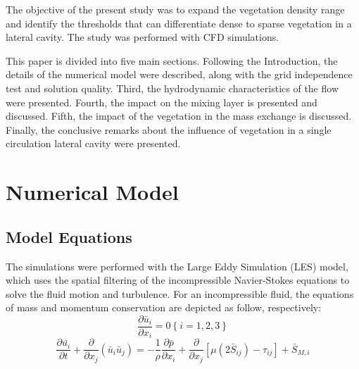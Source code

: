 The objective of the present study was to expand the vegetation density range and identify the thresholds that can differentiate dense to sparse vegetation in a lateral cavity. The study was performed with CFD simulations.

This paper is divided into five main sections. Following the Introduction, the details of the numerical model were described, along with the grid independence test and solution quality. Third, the hydrodynamic characteristics of the flow were presented. Fourth, the impact on the mixing layer is presented and discussed. Fifth, the impact of the vegetation in the mass exchange is discussed. Finally, the conclusive remarks about the influence of vegetation in a single circulation lateral cavity were presented.

\section{Numerical Model}
\subsection{Model Equations}
The simulations were performed with the Large Eddy Simulation (LES) model, which uses the spatial filtering of the incompressible Navier-Stokes equations to solve the fluid motion and turbulence. For an incompressible fluid, the equations of mass and momentum conservation are depicted as follow, respectively:
\begin{equation}
\frac{\partial \bar{u}_i}{\partial x_i}=0  \left \{ i=1,2,3 \right \}
\label{eqn:art4:continuity}
\end{equation}
\begin{equation}
\frac{\partial \bar{u_i}}{\partial t}+\frac{\partial}{\partial x_j}(\bar{u}_i \bar{u}_j)=-\frac{1}{\rho}\frac{\partial \bar{p}}{\partial x_i}+\frac{\partial}{\partial x_j}\left [ \mu (2\bar{S}_{ij}) - \tau_{ij} \right ] + \bar{S}_{M,i}
\label{eqn:art4:NS}
\end{equation}


